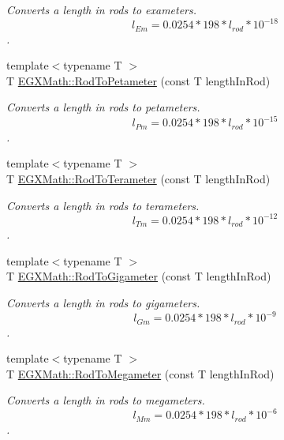 \begin{DoxyCompactItemize}
\begin{DoxyCompactList}\small\item\em Converts a length in rods to exameters. \[ l_{Em}=0.0254 * 198 * l_{rod} * 10^{-18} \]. \end{DoxyCompactList}\item 
{\footnotesize template$<$typename T $>$ }\\T \mbox{\hyperlink{group___e_g_x_math-_conversions-_length_conversions-_imperial-_rod-_s_i_ga058c851a5a43a832b21eb2b077683b17}{E\+G\+X\+Math\+::\+Rod\+To\+Petameter}} (const T length\+In\+Rod)
\begin{DoxyCompactList}\small\item\em Converts a length in rods to petameters. \[ l_{Pm}=0.0254 * 198 * l_{rod} * 10^{-15} \]. \end{DoxyCompactList}\item 
{\footnotesize template$<$typename T $>$ }\\T \mbox{\hyperlink{group___e_g_x_math-_conversions-_length_conversions-_imperial-_rod-_s_i_ga3a9ef9cdcea7b3d53cf5020bce58d117}{E\+G\+X\+Math\+::\+Rod\+To\+Terameter}} (const T length\+In\+Rod)
\begin{DoxyCompactList}\small\item\em Converts a length in rods to terameters. \[ l_{Tm}=0.0254 * 198 * l_{rod} * 10^{-12} \]. \end{DoxyCompactList}\item 
{\footnotesize template$<$typename T $>$ }\\T \mbox{\hyperlink{group___e_g_x_math-_conversions-_length_conversions-_imperial-_rod-_s_i_ga01d170f936da7b474a5ef3d7b8628d11}{E\+G\+X\+Math\+::\+Rod\+To\+Gigameter}} (const T length\+In\+Rod)
\begin{DoxyCompactList}\small\item\em Converts a length in rods to gigameters. \[ l_{Gm}=0.0254 * 198 * l_{rod} * 10^{-9} \]. \end{DoxyCompactList}\item 
{\footnotesize template$<$typename T $>$ }\\T \mbox{\hyperlink{group___e_g_x_math-_conversions-_length_conversions-_imperial-_rod-_s_i_ga9d9fb3fa0628bdf3b9fb60f719f8010e}{E\+G\+X\+Math\+::\+Rod\+To\+Megameter}} (const T length\+In\+Rod)
\begin{DoxyCompactList}\small\item\em Converts a length in rods to megameters. \[ l_{Mm}=0.0254 * 198 * l_{rod} * 10^{-6} \]. \end{DoxyCompactList}\item 

\end{DoxyCompactItemize}
